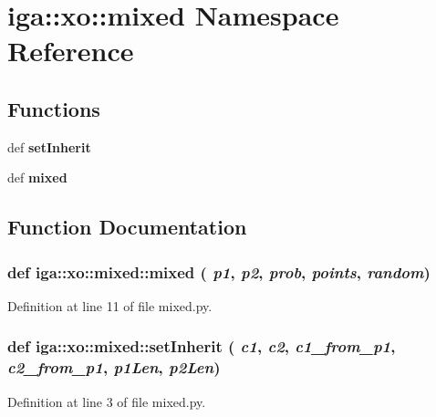 \section{iga::xo::mixed Namespace Reference}
\label{namespaceiga_1_1xo_1_1mixed}


\subsection*{Functions}
\begin{CompactItemize}
\item 
def {\bf setInherit}
\item 
def {\bf mixed}
\end{CompactItemize}


\subsection{Function Documentation}
\subsubsection{\setlength{\rightskip}{0pt plus 5cm}def iga::xo::mixed::mixed ( {\em p1},  {\em p2},  {\em prob},  {\em points},  {\em random})}\label{namespaceiga_1_1xo_1_1mixed_a75243a2bfae311c6dcdeb82991fade8}




Definition at line 11 of file mixed.py.
\subsubsection{\setlength{\rightskip}{0pt plus 5cm}def iga::xo::mixed::setInherit ( {\em c1},  {\em c2},  {\em c1\_\-from\_\-p1},  {\em c2\_\-from\_\-p1},  {\em p1Len},  {\em p2Len})}\label{namespaceiga_1_1xo_1_1mixed_00702d9f121e5f3393fbda7e7ad854db}




Definition at line 3 of file mixed.py.